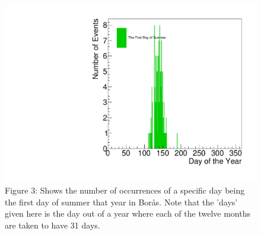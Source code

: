 \documentclass[a4, 12pt]{article}
\begin{document}
\begin{figure}[H]
\centering
\includegraphics[scale=0.45]{philipSummer.pdf}
\caption*{Figure 3: Shows the number of occurrences of a specific day being the first day of summer that year in Borås. Note that the 'days' given here is the day out of a year where each of the twelve months are taken to have 31 days.}
\end{figure}
\newpage




\end{document}
